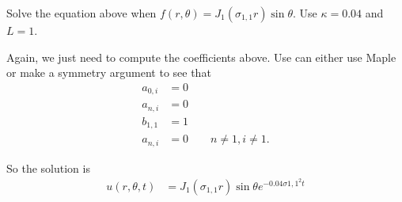 \begin{example}
Solve the equation above when $f(r,\theta) = J_1(\sigma_{1,1} r) \sin \theta$.  Use $\kappa=0.04$ and $L=1$.   

\solution

Again, we just need to compute the coefficients above.  Use can either use Maple or make a symmetry argument to see that
%
\begin{align*}
a_{0,i} & = 0 \\
a_{n,i} & = 0 \\
b_{1,1} & = 1 \\
a_{n,i} & = 0 \qquad n \neq 1, i \neq 1.  
\end{align*}

So the solution is 
% 
\begin{align*}
u(r, \theta,t) & = J_1(\sigma_{1,1} r) \sin \theta e^{-0.04 \sigma{1,1}^2 t} 
\end{align*}

\end{example}

